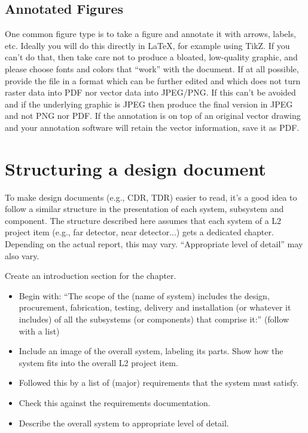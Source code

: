 \subsection{Annotated Figures}
\label{sec:annotate}

One common figure type is to take a figure and annotate it with
arrows, labels, etc.
Ideally you will do this directly in \LaTeX{}, for example using TikZ.
If you can't do that, then take care not to produce a bloated,
low-quality graphic, and please choose fonts and colors that ``work''
with the document.
If at all possible, provide the file in a format which can be further
edited and which does not turn raster data into PDF nor vector data
into JPEG/PNG.
If this can't be avoided and if the underlying graphic is JPEG then
produce the final version in JPEG and not PNG nor PDF.
If the annotation is on top of an original vector drawing and your
annotation software will retain the vector information, save it as
PDF.

\section{Structuring a design document}
\label{sec:design-doc}

To make design documents (e.g., CDR, TDR) easier to read, it's a good idea to follow a similar structure in the presentation of each system, subsystem and component. The structure described here assumes that each system of a L2 project item (e.g., far detector, near detector...) gets a dedicated chapter.  Depending on the actual report, this may vary. ``Appropriate level of detail'' may also vary.

Create an introduction section for the chapter.
\begin{itemize}
\item Begin with: ``The scope of the (name of system) includes the design, procurement, fabrication, testing, delivery and installation (or whatever it includes) of all the subsystems (or components) that comprise it:'' (follow with a list)
\item Include an image of the overall system, labeling its parts. Show how the system fits into the overall L2 project item.
\item Followed this by a list of (major) requirements that the system must satisfy.
\item Check this against the requirements documentation.
\item Describe the overall system to appropriate level of detail.
\end{itemize}

